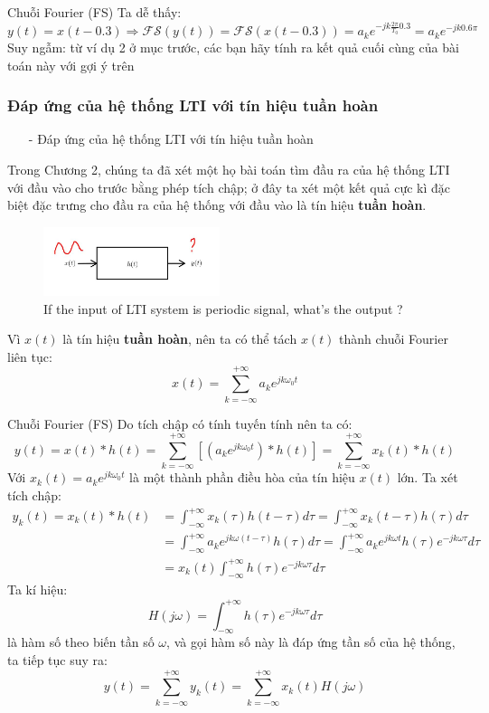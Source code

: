 \documentclass[8pt]{beamer}
\begin{document}
\begin{frame}{Chuỗi Fourier (FS)}
Ta dễ thấy:
$$y(t)=x(t-0.3)\Rightarrow \mathscr{FS}(y(t))=\mathscr{FS}(x(t-0.3))=a_{k}e^{-jk\frac{2\pi}{T_{0}}0.3}=a_{k}e^{-jk0.6\pi}$$
Suy ngẫm: từ ví dụ 2 ở mục trước, các bạn hãy tính ra kết quả cuối cùng của bài toán này với gợi ý trên
\subsubsection{Đáp ứng của hệ thống LTI với tín hiệu tuần hoàn}
\begin{itemize}
	\item[-] Đáp ứng của hệ thống LTI với tín hiệu tuần hoàn
\end{itemize}
Trong \alert{Chương 2}, chúng ta đã xét một họ bài toán tìm đầu ra của hệ thống LTI với đầu vào cho trước bằng phép tích chập; ở đây ta xét một kết quả cực kì đặc biệt đặc trưng cho đầu ra của hệ thống với đầu vào là tín hiệu \textbf{tuần hoàn}. 
\begin{figure}[h]
			\includegraphics[width=0.46\textwidth]{ht.jpg}
			\caption{If the input of LTI system is periodic signal, what's the output ?}\label{fig:re11}

		\end{figure}
Vì $x(t)$ là tín hiệu \textbf{tuần hoàn}, nên ta có thể tách $x(t)$ thành chuỗi Fourier liên tục:
$$x(t)=\sum_{k=-\infty}^{+\infty}a_{k}e^{jk\omega_{0} t}$$
\end{frame}
\begin{frame}{Chuỗi Fourier (FS)}
Do tích chập có tính \alert{tuyến tính} nên ta có:
$$y(t)=x(t)*h(t)=\sum_{k=-\infty}^{+\infty}[(a_{k}e^{jk\omega_{0}t})*h(t)]=\sum_{k=-\infty}^{+\infty}x_{k}(t)*h(t)$$
Với $x_{k}(t)=a_{k}e^{jk\omega_{0}t}$ là một thành phần điều hòa của tín hiệu $x(t)$ lớn. Ta xét tích chập:
\begin{equation*}
\begin{split}
	y_{k}(t)=x_{k}(t)*h(t)&=\int_{-\infty}^{+\infty}x_{k}(\tau)h(t-\tau)d\tau=\int_{-\infty}^{+\infty}x_{k}(t-\tau)h(\tau)d\tau\\&=\int_{-\infty}^{+\infty}a_{k}e^{jk\omega(t-\tau)}h(\tau)d\tau=\int_{-\infty}^{+\infty}a_{k}e^{jk\omega t}h(\tau)e^{-jk\omega\tau}d\tau\\&=x_{k}(t)\int_{-\infty}^{+\infty}h(\tau)e^{-jk\omega\tau}d\tau
\end{split}
\end{equation*}
Ta kí hiệu:
$$H(j\omega)=\int_{-\infty}^{+\infty}h(\tau)e^{-jk\omega\tau}d\tau$$
là hàm số theo biến tần số $\omega$, và gọi hàm số này là \alert{đáp ứng tần số của hệ thống},
ta tiếp tục suy ra:
$$y(t)=\sum_{k=-\infty}^{+\infty}y_{k}(t)=\sum_{k=-\infty}^{+\infty}x_{k}(t)H(j\omega)$$
\end{frame}
\end{document}
